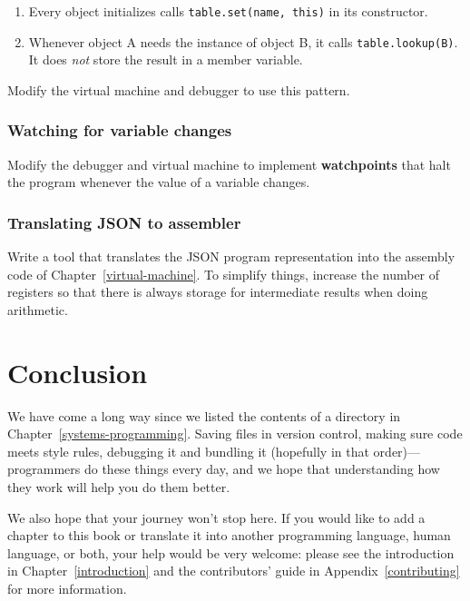 \documentclass[krantzl]{krantz}
\newcommand{\appref}[1]{Appendix~\ref{#1}}
\newcommand{\chapref}[1]{Chapter~\ref{#1}}
\newcommand{\glossref}[1]{\textbf{#1}}
\begin{document}
\begin{enumerate}

\item 

Every object initializes calls \texttt{table.set(name, this)} in its constructor.



\item 

Whenever object A needs the instance of object B,
    it calls \texttt{table.lookup({\textquotesingle}B{\textquotesingle})}.
    It does \emph{not} store the result in a member variable.



\end{enumerate}


Modify the virtual machine and debugger to use this pattern.

\subsection*{Watching for variable changes}


Modify the debugger and virtual machine to implement \glossref{watchpoints}
that halt the program whenever the value of a variable changes.

\subsection*{Translating JSON to assembler}


Write a tool that translates the JSON program representation
into the assembly code of \chapref{virtual-machine}.
To simplify things,
increase the number of registers so that
there is always storage for intermediate results
when doing arithmetic.

\chapter{Conclusion}\label{conclusion}


We have come a long way since we listed the contents of a directory in \chapref{systems-programming}.
Saving files in version control,
making sure code meets style rules,
debugging it and bundling it (hopefully in that order)—programmers do these things every day,
and we hope that understanding how they work will help you do them better.


We also hope that your journey won’t stop here.
If you would like to add a chapter to this book
or translate it into another programming language,
human language,
or both,
your help would be very welcome:
please see the introduction in \chapref{introduction}
and the contributors’ guide in \appref{contributing} for more information.
\end{document}
